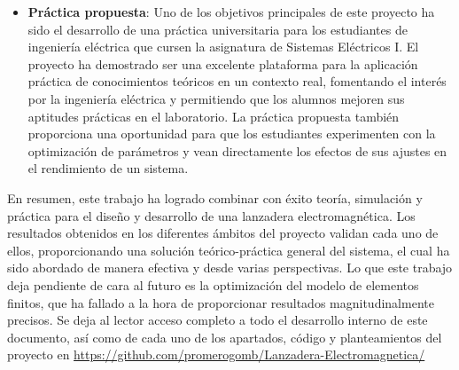 \begin{itemize}
    \item \textbf{Práctica propuesta}: Uno de los objetivos principales de este proyecto ha sido el desarrollo de una práctica universitaria para los estudiantes de ingeniería eléctrica que cursen la asignatura de Sistemas Eléctricos I. El proyecto ha demostrado ser una excelente plataforma para la aplicación práctica de conocimientos teóricos en un contexto real, fomentando el interés por la ingeniería eléctrica y permitiendo que los alumnos mejoren sus aptitudes prácticas en el laboratorio. La práctica propuesta también proporciona una oportunidad para que los estudiantes experimenten con la optimización de parámetros y vean directamente los efectos de sus ajustes en el rendimiento de un sistema.
\end{itemize}

En resumen, este trabajo ha logrado combinar con éxito teoría, simulación y práctica para el diseño y desarrollo de una lanzadera electromagnética. Los resultados obtenidos en los diferentes ámbitos del proyecto validan cada uno de ellos, proporcionando una solución teórico-práctica general del sistema, el cual ha sido abordado de manera efectiva y desde varias perspectivas. Lo que este trabajo deja pendiente de cara al futuro es la optimización del modelo de elementos finitos, que ha fallado a la hora de proporcionar resultados magnitudinalmente precisos. Se deja al lector acceso completo a todo el desarrollo interno de este documento, así como de cada uno de los apartados, código y planteamientos del proyecto en \href{URL}{https://github.com/promerogomb/Lanzadera-Electromagnetica/}